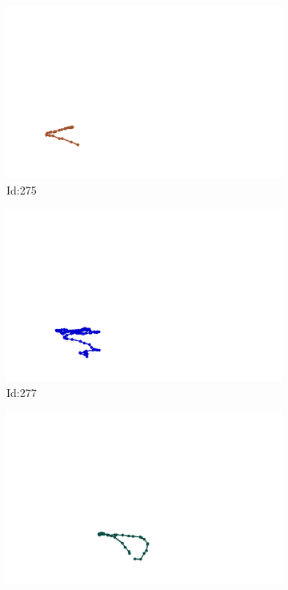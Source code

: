 \documentclass[12pt,twoside]{report}
\begin{document}
\begin{figure}
\centering
\begin{subfigure}[b]{0.20\textwidth}
\centering
\includegraphics[width=\textwidth]{../../trajectories/275.png}
\caption{Id:275}
\end{subfigure}
\begin{subfigure}[b]{0.20\textwidth}
\centering
\includegraphics[width=\textwidth]{../../trajectories/277.png}
\caption{Id:277}
\end{subfigure}
\begin{subfigure}[b]{0.20\textwidth}
\centering
\includegraphics[width=\textwidth]{../../trajectories/409.png}

\end{subfigure}
\end{figure}
\end{document}
